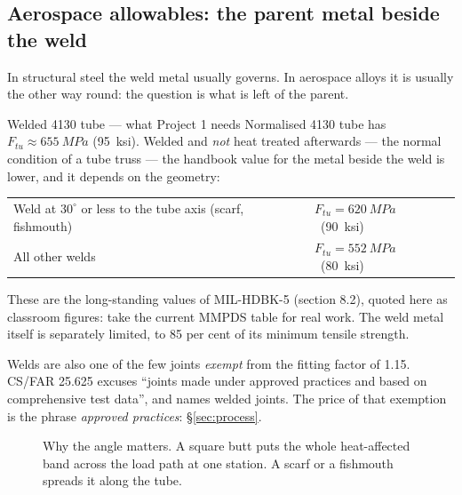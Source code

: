 \documentclass[11pt,a4paper]{article}
\begin{document}
\subsection{Aerospace allowables: the parent metal beside the weld}

In structural steel the weld metal usually governs. In aerospace alloys it is usually the other
way round: the question is what is left of the parent.

\begin{aerobox}{Welded 4130 tube --- what Project 1 needs}
Normalised 4130 tube has $F_{tu}\approx\SI{655}{MPa}$ (\SI{95}{ksi}). Welded and \emph{not} heat
treated afterwards --- the normal condition of a tube truss --- the handbook value for the metal
beside the weld is lower, and it depends on the geometry:

\begin{center}\small
\begin{tabular}{@{}ll@{}}
\toprule
Weld at $30^\circ$ or less to the tube axis (scarf, fishmouth) & $F_{tu}=\SI{620}{MPa}$ \ (\SI{90}{ksi})\\
All other welds & $F_{tu}=\SI{552}{MPa}$ \ (\SI{80}{ksi})\\
\bottomrule
\end{tabular}
\end{center}

\noindent These are the long-standing values of MIL-HDBK-5 (section 8.2), quoted here as classroom
figures: take the current MMPDS table for real work. The weld metal itself is separately limited,
to 85 per cent of its minimum tensile strength.

\medskip
Welds are also one of the few joints \emph{exempt} from the fitting factor of 1.15. CS/FAR 25.625
excuses ``joints made under approved practices and based on comprehensive test data'', and names
welded joints. The price of that exemption is the phrase \emph{approved practices}:
\S\ref{sec:process}.
\end{aerobox}

\begin{figure}[H]\centering
\resizebox{0.95\textwidth}{!}{}
\caption{Why the angle matters. A square butt puts the whole heat-affected band across the load
path at one station. A scarf or a fishmouth spreads it along the tube.}
\label{fig:tube}
\end{figure}
\end{document}
